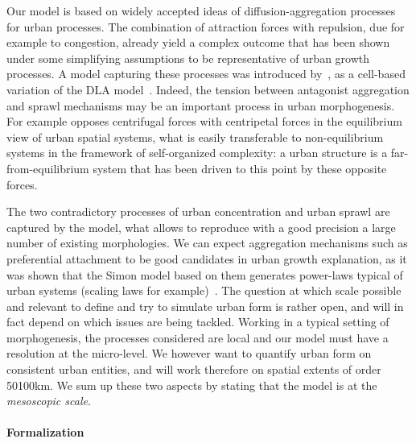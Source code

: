 \documentclass[10pt,letterpaper]{article}
\begin{document}
Our model is based on widely accepted ideas of diffusion-aggregation processes for urban processes. The combination of attraction forces with repulsion, due for example to congestion, already yield a complex outcome that has been shown under some simplifying assumptions to be representative of urban growth processes. A model capturing these processes was introduced by~\cite{batty2006hierarchy}, as a cell-based variation of the DLA model~\cite{batty1991generating}. Indeed, the tension between antagonist aggregation and sprawl mechanisms may be an important process in urban morphogenesis. For example \cite{fujita1996economics} opposes centrifugal forces with centripetal forces in the equilibrium view of urban spatial systems, what is easily transferable to non-equilibrium systems in the framework of self-organized complexity: a urban structure is a far-from-equilibrium system that has been driven to this point by these opposite forces. 

The two contradictory processes of urban concentration and urban sprawl are captured by the model, what allows to reproduce with a good precision a large number of existing morphologies. We can expect aggregation mechanisms such as preferential attachment to be good candidates in urban growth explanation, as it was shown that the Simon model based on them generates power-laws typical of urban systems (scaling laws for example)~\cite{2016arXiv160806313S}. The question at which scale  possible and relevant to define and try to simulate urban form is rather open, and will in fact depend on which issues are being tackled. Working in a typical setting of morphogenesis, the processes considered are local and our model must have a resolution at the micro-level. We however want to quantify urban form on consistent urban entities, and will work therefore on spatial extents of order 50\added{-}100km. We sum up these two aspects by stating that the model is at the \emph{mesoscopic scale}. 


\paragraph*{Formalization}
\end{document}
